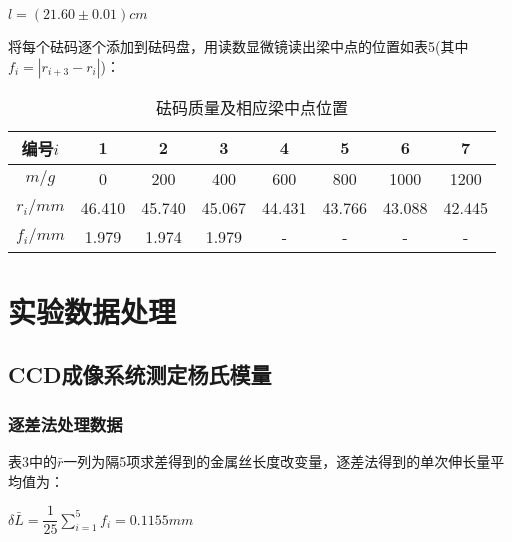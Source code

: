 \documentclass[a4 paper,12pt]{article}
\begin{document}
\begin{center}
	$l=(21.60\pm0.01)cm$
\end{center}
\par 将每个砝码逐个添加到砝码盘，用读数显微镜读出梁中点的位置如表5(其中$f_{i}=|r_{i+3}-r_{i}|$)：
\begin{table}[H]
	\caption{砝码质量及相应梁中点位置}
	\label{砝码质量及相应梁中点位置}
	\centering
	\begin{tabular}{*{8}{c}}
		\toprule[0.5mm]
		编号$i$&1&2&3&4&5&6&7\\
		\midrule
		$m/g$&0&200&400&600&800&1000&1200\\
		$r_{i}/mm$&46.410&45.740&45.067&44.431&43.766&43.088&42.445\\
		$f_{i}/mm$&1.979&1.974&1.979&-&-&-&-\\
		\bottomrule[0.5mm]
	\end{tabular}
\end{table}
\section{实验数据处理}
\subsection{CCD成像系统测定杨氏模量}
\subsubsection{逐差法处理数据}
表3中的$\bar{r}$一列为隔5项求差得到的金属丝长度改变量，逐差法得到的单次伸长量平均值为：
\begin{center}
	$\delta \bar{L}=\dfrac{1}{25}\sum\limits_{i=1}^{5}f_{i}=0.1155mm$
\end{center}
\end{document}
